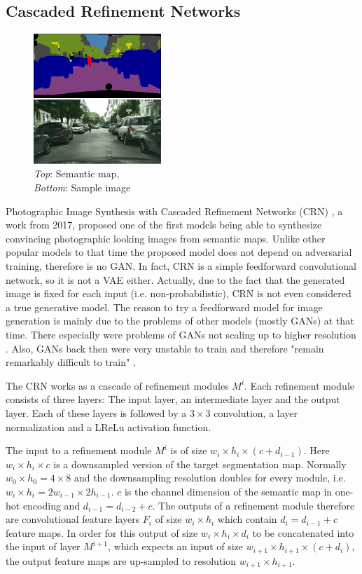 \subsection{Cascaded Refinement Networks} \label{sec:3.2.1}
%
\begin{figure}
    \begin{center}
        \includegraphics[width=0.43\textwidth]{Chapters/figures/crn_example.PNG}
    \end{center}
    \caption[]{\textit{Top}: Semantic map, \\\textit{Bottom}: Sample image}
\end{figure}
%
Photographic Image Synthesis with Cascaded Refinement Networks (CRN) \cite{crn}, a work from 2017, proposed one of the first models being able to synthesize convincing photographic looking images from semantic maps. Unlike other popular models to that time the proposed model does not depend on adversarial training, therefore is no GAN. In fact, CRN is a simple feedforward convolutional network, so it is not a VAE either. Actually, due to the fact that the generated image is fixed for each input (i.e. non-probabilistic), CRN is not even considered a true generative model. The reason to try a feedforward model for image generation is mainly due to the problems of other models (mostly GANs) at that time. There especially were problems of GANs not scaling up to higher resolution \cite{crn}. Also, GANs back then were very unstable to train and therefore "remain remarkably difficult to train"
\cite{crn}.

The CRN works as a cascade of refinement modules $M^i$. Each refinement module consists of three layers: The input layer, an intermediate layer and the output layer. Each of these layers is followed by a $3\times3$ convolution, a layer normalization and a LReLu activation function. 

The input to a refinement module $M^i$ is of size $w_i\times h_i\times(c + d_{i-1})$. Here $w_i\times h_i\times c$ is a downsampled version of the target segmentation map. Normally $w_0\times h_0=4\times 8$ and the downsampling resolution doubles for every module, i.e. $w_i\times h_i=2w_{i-1}\times2h_{i-1}$. $c$ is the channel dimension of the semantic map in one-hot encoding and $d_{i-1}=d_{i-2}+c$. The outputs of a refinement module therefore are convolutional feature layers $F_i$ of size $w_i\times h_i$ which contain $d_i=d_{i-1}+c$ feature maps. In order for this output of size $w_i\times h_i\times d_i$ to be concatenated into the input of layer $M^{i+1}$, which expects an input of size $w_{i+1}\times h_{i+1}\times (c + d_i)$, the output feature maps are up-sampled to resolution $w_{i+1}\times h_{i+1}$.

